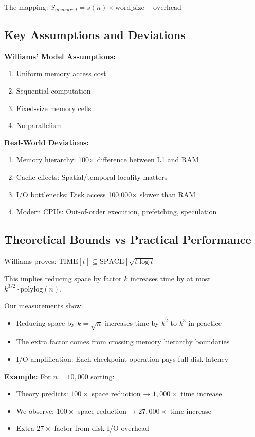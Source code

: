 \documentclass[11pt]{article}
\theoremstyle{definition}
\begin{document}
The mapping: $S_{measured} = s(n) \times \text{word\_size} + \text{overhead}$

\subsection{Key Assumptions and Deviations}

\textbf{Williams' Model Assumptions:}
\begin{enumerate}
\item Uniform memory access cost
\item Sequential computation
\item Fixed-size memory cells
\item No parallelism
\end{enumerate}

\textbf{Real-World Deviations:}
\begin{enumerate}
\item Memory hierarchy: 100$\times$ difference between L1 and RAM
\item Cache effects: Spatial/temporal locality matters
\item I/O bottlenecks: Disk access 100,000$\times$ slower than RAM
\item Modern CPUs: Out-of-order execution, prefetching, speculation
\end{enumerate}

\subsection{Theoretical Bounds vs Practical Performance}

Williams proves: $\text{TIME}[t] \subseteq \text{SPACE}[\sqrt{t \log t}]$

This implies reducing space by factor $k$ increases time by at most $k^{3/2} \cdot \text{polylog}(n)$.

Our measurements show:
\begin{itemize}
\item Reducing space by $k = \sqrt{n}$ increases time by $k^2$ to $k^3$ in practice
\item The extra factor comes from crossing memory hierarchy boundaries
\item I/O amplification: Each checkpoint operation pays full disk latency
\end{itemize}

\textbf{Example:} For $n = 10,000$ sorting:
\begin{itemize}
\item Theory predicts: $100\times$ space reduction → $1,000\times$ time increase
\item We observe: $100\times$ space reduction → $27,000\times$ time increase
\item Extra $27\times$ factor from disk I/O overhead
\end{itemize}
\end{document}
